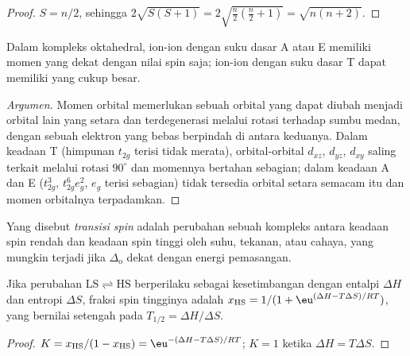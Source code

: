 \begin{proof}
$S = n/2$, sehingga $2\sqrt{S(S+1)} = 2\sqrt{\frac n2(\frac n2 + 1)} = \sqrt{n(n+2)}$.
\end{proof}

\begin{proposition}\label{prop:b3:complex-spectra-magnetism:orbital-contribution}
Dalam kompleks oktahedral, ion-ion dengan suku dasar A atau E memiliki momen yang dekat dengan
nilai spin saja; ion-ion dengan suku dasar T dapat memiliki 
yang cukup besar.
\end{proposition}

\begin{proof}[Argumen]
Momen orbital memerlukan sebuah orbital yang dapat diubah menjadi orbital lain
yang setara dan terdegenerasi melalui rotasi terhadap sumbu medan, dengan
sebuah elektron yang bebas berpindah di antara keduanya. Dalam keadaan T (himpunan $t_{2g}$ terisi tidak merata), orbital-orbital $d_{xz}$, $d_{yz}$, $d_{xy}$
saling terkait melalui rotasi $90^\circ$ dan momennya bertahan sebagian; dalam keadaan A dan E
($t_{2g}^3$, $t_{2g}^6e_g^2$, $e_g$ terisi sebagian) tidak tersedia orbital setara semacam itu dan
momen orbitalnya terpadamkan.
\end{proof}

\begin{definition}\label{def:b3:complex-spectra-magnetism:spin-crossover}
Yang disebut \emph{transisi spin} adalah perubahan sebuah kompleks
antara keadaan spin rendah dan keadaan spin tinggi oleh suhu, tekanan, atau cahaya,
yang mungkin terjadi jika $\Delta_{\mathrm o}$ dekat dengan energi pemasangan.
\end{definition}

\begin{proposition}\label{prop:b3:complex-spectra-magnetism:crossover}
Jika perubahan $\mathrm{LS} \rightleftharpoons \mathrm{HS}$ berperilaku sebagai kesetimbangan dengan entalpi $\Delta H$ dan entropi $\Delta S$,
fraksi spin tingginya adalah $x_{\mathrm{HS}} = 1/(1 + \eu^{(\Delta H - T\Delta S)/RT})$, yang bernilai setengah pada $T_{1/2} = \Delta H/\Delta S$.
\end{proposition}

\begin{proof}
$K = x_{\mathrm{HS}}/(1 - x_{\mathrm{HS}}) = \eu^{-(\Delta H - T\Delta S)/RT}$; $K = 1$ ketika $\Delta H = T\Delta S$.
\end{proof}

